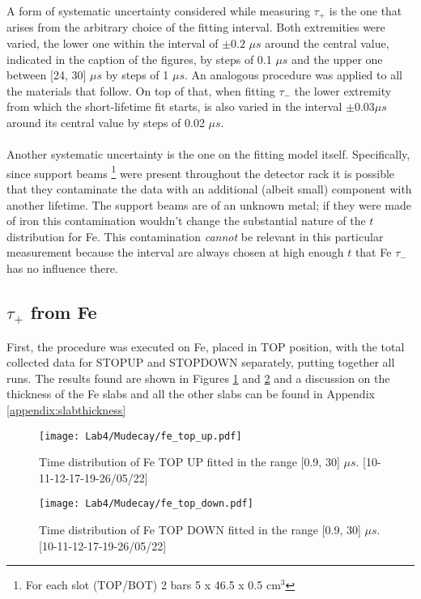 \documentclass[10pt,a4paper,twocolumn]{article}
\begin{document}
A form of systematic uncertainty considered while measuring $\tau_+$ is the one that arises from the arbitrary choice of the fitting interval. Both extremities were varied, the lower one within the interval of $\pm 0.2$ $\mu s$ around the central value, indicated in the caption of the figures, by steps of 0.1 $\mu s$ and the upper one between [24, 30] $\mu s$ by steps of 1 $\mu s$. An analogous procedure was applied to all the materials that follow. On top of that, when fitting $\tau_-$ the lower extremity from which the short-lifetime fit starts, is also varied in the interval $\pm 0.03 \mu s$ around its central value by steps of 0.02 $\mu s$.
\\
\\
Another systematic uncertainty is the one on the fitting model itself. Specifically, since support beams \footnote{For each slot (TOP/BOT) 2 bars 5 x 46.5 x 0.5 cm$^3$} were present throughout the detector rack it is possible that they contaminate the data with an additional (albeit small) component with another lifetime. The support beams are of an unknown metal; if they were made of iron this contamination wouldn't change the substantial nature of the $t$ distribution for Fe. This contamination \textit{cannot} be relevant in this particular measurement because the interval are always chosen at high enough $t$ that Fe $\tau_-$ has no influence there.


\subsection{$\tau_+$ from Fe}

First, the procedure was executed on Fe, placed in TOP position, with the total collected data for STOPUP and STOPDOWN separately, putting together all runs. The results found are shown in Figures \ref{FEUP} and \ref{FEDWN} and a discussion on the thickness of the Fe slabs and all the other slabs can be found in Appendix \ref{appendix:slabthickness}

\begin{figure}[h!]
\centering
\caption{Time distribution of Fe TOP UP fitted in the range [0.9, 30] $\mu s$. [10-11-12-17-19-26/05/22]}
\texttt{[image: Lab4/Mudecay/fe\_top\_up.pdf]} 
\label{FEUP}
\end{figure}

\begin{figure}[h!]
\centering
\caption{Time distribution of Fe TOP DOWN fitted in the range [0.9, 30] $\mu s$. [10-11-12-17-19-26/05/22]}
\texttt{[image: Lab4/Mudecay/fe\_top\_down.pdf]} 
\label{FEDWN}
\end{figure}
\end{document}
